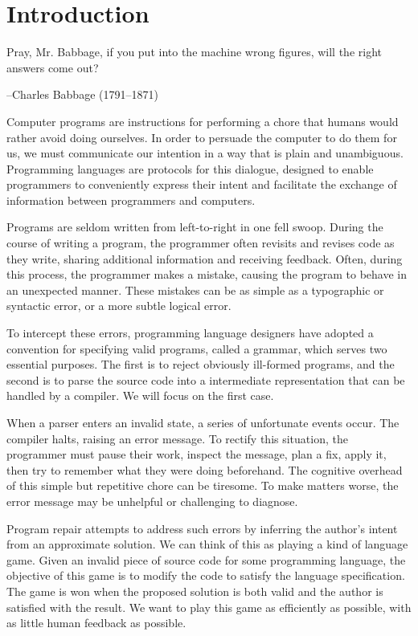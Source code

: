 \chapter*{\rm\bfseries Introduction}
\label{ch:introduction}

\epigraph{Pray, Mr. Babbage, if you put into the machine wrong figures, will the right answers come out?}{--Charles Babbage (1791--1871)}


Computer programs are instructions for performing a chore that humans would rather avoid doing ourselves. In order to persuade the computer to do them for us, we must communicate our intention in a way that is plain and unambiguous. Programming languages are protocols for this dialogue, designed to enable programmers to conveniently express their intent and facilitate the exchange of information between programmers and computers.

Programs are seldom written from left-to-right in one fell swoop. During the course of writing a program, the programmer often revisits and revises code as they write, sharing additional information and receiving feedback. Often, during this process, the programmer makes a mistake, causing the program to behave in an unexpected manner. These mistakes can be as simple as a typographic or syntactic error, or a more subtle logical error.

To intercept these errors, programming language designers have adopted a convention for specifying valid programs, called a grammar, which serves two essential purposes. The first is to reject obviously ill-formed programs, and the second is to parse the source code into a intermediate representation that can be handled by a compiler. We will focus on the first case.

When a parser enters an invalid state, a series of unfortunate events occur. The compiler halts, raising an error message. To rectify this situation, the programmer must pause their work, inspect the message, plan a fix, apply it, then try to remember what they were doing beforehand. The cognitive overhead of this simple but repetitive chore can be tiresome. To make matters worse, the error message may be unhelpful or challenging to diagnose.

Program repair attempts to address such errors by inferring the author's intent from an approximate solution. We can think of this as playing a kind of language game. Given an invalid piece of source code for some programming language, the objective of this game is to modify the code to satisfy the language specification. The game is won when the proposed solution is both valid and the author is satisfied with the result. We want to play this game as efficiently as possible, with as little human feedback as possible.

